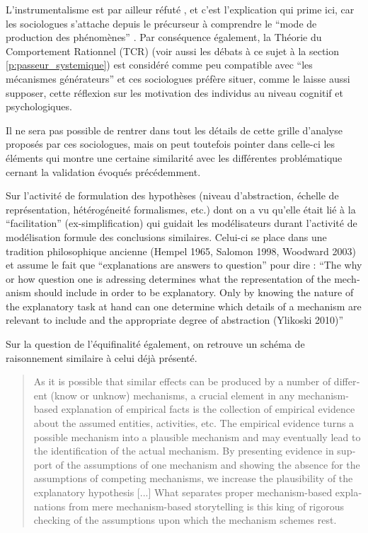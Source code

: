 L'instrumentalisme est par ailleur réfuté  \autocite{Hedstrom2010}, et c'est l'explication qui prime ici, car les sociologues s'attache depuis le précurseur \textcite{Harre1972} à comprendre le \enquote{mode de production des phénomènes} . Par conséquence également, la Théorie du Comportement Rationnel (TCR) (voir aussi les débats à ce sujet à la section \ref{p:passeur_systemique}) est considéré comme peu compatible avec \enquote{les mécanismes générateurs} et ces sociologues préfère situer, comme \textcite{Conte2007} le laisse aussi supposer, cette réflexion sur les motivation des individus au niveau cognitif et psychologiques. 

Il ne sera pas possible de rentrer dans tout les détails de cette grille d'analyse proposés par ces sociologues, mais on peut toutefois pointer dans celle-ci les éléments qui montre une certaine similarité avec les différentes problématique cernant la validation évoqués précédemment.

Sur l'activité de formulation des hypothèses (niveau d'abstraction, échelle de représentation, hétérogéneité formalismes, etc.) dont on a vu qu'elle était lié à la \enquote{facilitation} (ex-simplification) qui guidait les modélisateurs durant l'activité de modélisation \textcite{Hedstrom2010} formule des conclusions similaires. Celui-ci se place dans une tradition philosophique ancienne (Hempel 1965, Salomon 1998, Woodward 2003) et assume le fait que \enquote{explanations are answers to question} pour dire : \foreignquote{english}{The why or how question one is adressing determines what the representation of the mechanism should include in order to be explanatory. Only by knowing the nature of the explanatory task at hand can one determine which details of a mechanism are relevant to include and the appropriate degree of abstraction (Ylikoski 2010)}

Sur la question de l'équifinalité également, on retrouve un schéma de raisonnement similaire à celui déjà présenté.

\foreignblockquote{english}[\cite{Hedstrom2010}]{As it is possible that similar effects can be produced by a number of different (know or unknow) mechanisms, a crucial element in any mechanism-based explanation of empirical facts is the collection of empirical evidence about the assumed entities, activities, etc. The empirical evidence turns a possible mechanism into a plausible mechanism and may eventually lead to the identification of the actual mechanism. By presenting evidence in support of the assumptions of one mechanism and showing the absence for the assumptions of competing mechanisms, we increase the plausibility of the explanatory hypothesis [...] What separates proper mechanism-based explanations from mere mechanism-based storytelling is this king of rigorous checking of the assumptions upon which the mechanism schemes rest.}

